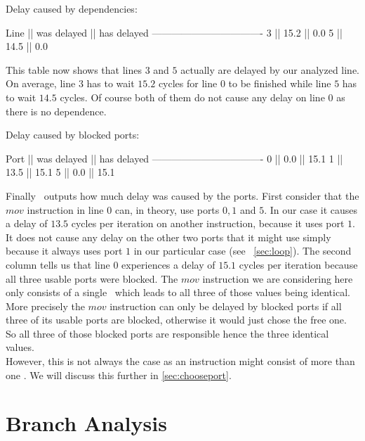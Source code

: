 \begin{Example}
Delay caused by dependencies:

Line || was delayed || has delayed
----------------------------------
 3   ||    15.2     ||     0.0
 5   ||    14.5     ||     0.0
\end{Example}

This table now shows that lines $3$ and $5$ actually are delayed by our analyzed line. On average, line $3$ has to wait $15.2$ cycles for line $0$ to be finished while line $5$ has to wait $14.5$ cycles. Of course both of them do not cause any delay on line $0$ as there is no dependence.\\

\begin{Example}
Delay caused by blocked ports:

Port || was delayed || has delayed
----------------------------------
 0   ||     0.0     ||    15.1
 1   ||    13.5     ||    15.1
 5   ||     0.0     ||    15.1
\end{Example}

Finally \suaca\ outputs how much delay was caused by the ports. First consider that the $mov$ instruction in line $0$ can, in theory, use ports $0, 1$ and $5$. In our case it causes a delay of $13.5$ cycles per iteration on another instruction, because it uses port $1$. It does not cause any delay on the other two ports that it might use simply because it always uses port $1$ in our particular case (see ~\autoref{sec:loop}). The second column tells us that line $0$ experiences a delay of $15.1$ cycles per iteration because all three usable ports were blocked. The $mov$ instruction we are considering here only consists of a single \microop\ which leads to all three of those values being identical.\\
More precisely the $mov$ instruction can only be delayed by blocked ports if all three of its usable ports are blocked, otherwise it would just chose the free one. So all three of those blocked ports are responsible hence the three identical values.\\
However, this is not always the case as an instruction might consist of more than one \microop. We will discuss this further in \autoref{sec:chooseport}.




\section{Branch Analysis}

